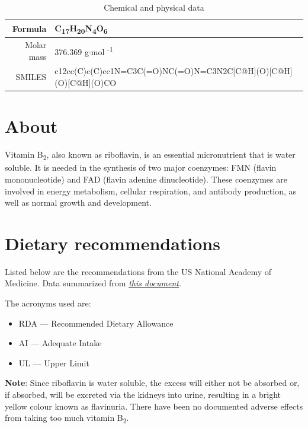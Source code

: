 \documentclass{book}
\begin{document}
\begin{table}[h]
	\caption{Chemical and physical data}
	\centering \begin{tabular}{| r | l |}
		\hline
		Formula & C\textsubscript{17}H\textsubscript{20}N\textsubscript{4}O\textsubscript{6}\\ \hline
		Molar mass & 376.369 g$\cdot$mol \textsuperscript{-1}\\ \hline
		SMILES & c12cc(C)c(C)cc1N=C3C(=O)NC(=O)N=C3N2C[C@H](O)[C@H](O)[C@H](O)CO\\ \hline
	\end{tabular}
\end{table}
\newpage

\section{About}
Vitamin B\textsubscript{2}, also known as riboflavin, is an essential micronutrient that is water soluble. It is needed in the synthesis of two major coenzymes: FMN (flavin mononucleotide) and FAD (flavin adenine dinucleotide). These coenzymes are involved in energy metabolism, cellular respiration, and antibody production, as well as normal growth and development.

\section{Dietary recommendations}
Listed below are the recommendations from the US National Academy of Medicine. Data summarized from \href{https://nap.nationalacademies.org/read/6015/chapter/7}{\textit{this document}}.

The acronyms used are:
\begin{itemize}
	\item RDA --- Recommended Dietary Allowance
	\item AI --- Adequate Intake
	\item UL --- Upper Limit
\end{itemize}

\textbf{Note}: Since riboflavin is water soluble, the excess will either not be absorbed or, if absorbed, will be excreted via the kidneys into urine, resulting in a bright yellow colour known as flavinuria. There have been no documented adverse effects from taking too much vitamin B\textsubscript{2}.
\end{document}
